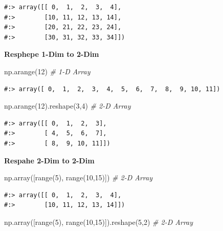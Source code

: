 \documentclass[
]{book}
\newenvironment{Shaded}{\begin{snugshade}}{\end{snugshade}}
\newcommand{\BuiltInTok}[1]{#1}
\newcommand{\CommentTok}[1]{\textcolor[rgb]{0.37,0.37,0.37}{\textit{#1}}}
\newcommand{\DecValTok}[1]{\textcolor[rgb]{0.06,0.06,0.06}{#1}}
\newcommand{\NormalTok}[1]{#1}
\begin{document}
\begin{verbatim}
#:> array([[ 0,  1,  2,  3,  4],
#:>        [10, 11, 12, 13, 14],
#:>        [20, 21, 22, 23, 24],
#:>        [30, 31, 32, 33, 34]])
\end{verbatim}

\textbf{Resphepe 1-Dim to 2-Dim}

\begin{Shaded}
\begin{Highlighting}[]
\NormalTok{np.arange(}\DecValTok{12}\NormalTok{) }\CommentTok{# 1-D Array}
\end{Highlighting}
\end{Shaded}

\begin{verbatim}
#:> array([ 0,  1,  2,  3,  4,  5,  6,  7,  8,  9, 10, 11])
\end{verbatim}

\begin{Shaded}
\begin{Highlighting}[]
\NormalTok{np.arange(}\DecValTok{12}\NormalTok{).reshape(}\DecValTok{3}\NormalTok{,}\DecValTok{4}\NormalTok{)  }\CommentTok{# 2-D Array}
\end{Highlighting}
\end{Shaded}

\begin{verbatim}
#:> array([[ 0,  1,  2,  3],
#:>        [ 4,  5,  6,  7],
#:>        [ 8,  9, 10, 11]])
\end{verbatim}

\textbf{Respahe 2-Dim to 2-Dim}

\begin{Shaded}
\begin{Highlighting}[]
\NormalTok{np.array([}\BuiltInTok{range}\NormalTok{(}\DecValTok{5}\NormalTok{), }\BuiltInTok{range}\NormalTok{(}\DecValTok{10}\NormalTok{,}\DecValTok{15}\NormalTok{)])  }\CommentTok{# 2-D Array}
\end{Highlighting}
\end{Shaded}

\begin{verbatim}
#:> array([[ 0,  1,  2,  3,  4],
#:>        [10, 11, 12, 13, 14]])
\end{verbatim}

\begin{Shaded}
\begin{Highlighting}[]
\NormalTok{np.array([}\BuiltInTok{range}\NormalTok{(}\DecValTok{5}\NormalTok{), }\BuiltInTok{range}\NormalTok{(}\DecValTok{10}\NormalTok{,}\DecValTok{15}\NormalTok{)]).reshape(}\DecValTok{5}\NormalTok{,}\DecValTok{2}\NormalTok{) }\CommentTok{# 2-D Array}
\end{Highlighting}
\end{Shaded}
\end{document}
